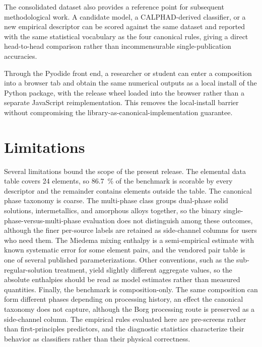 \documentclass[review,times,nonatbib]{elsarticle}
\begin{document}
The consolidated dataset also provides a reference point for
subsequent methodological work. A candidate model, a CALPHAD-derived
classifier, or a new empirical descriptor can be scored against the
same dataset and reported with the same statistical vocabulary as the
four canonical rules, giving a direct head-to-head comparison rather
than incommensurable single-publication accuracies.

Through the Pyodide front end, a researcher or student can enter a
composition into a browser tab and obtain the same numerical outputs
as a local install of the Python package, with the release wheel
loaded into the browser rather than a separate JavaScript
reimplementation. This removes the local-install barrier without
compromising the library-as-canonical-implementation guarantee.

\section{Limitations}

Several limitations bound the scope of the present release. The
elemental data table covers 24 elements, so \SI{86.7}{\percent} of
the benchmark is scorable by every descriptor and the remainder
contains elements outside the table. The canonical phase taxonomy
is coarse. The multi-phase class groups dual-phase solid solutions,
intermetallics, and amorphous alloys together, so the binary
single-phase-versus-multi-phase evaluation does not distinguish
among these outcomes, although the finer per-source labels are
retained as side-channel columns for users who need them. The
Miedema mixing enthalpy is a semi-empirical estimate with known
systematic error for some element pairs, and the vendored pair
table is one of several published parameterizations. Other
conventions, such as the sub-regular-solution treatment, yield
slightly different aggregate values, so the absolute enthalpies
should be read as model estimates rather than measured quantities.
Finally, the benchmark is composition-only. The same composition
can form different phases depending on processing history, an effect
the canonical taxonomy does not capture, although the Borg
processing route is preserved as a side-channel column. The
empirical rules evaluated here are pre-screens rather than
first-principles predictors, and the diagnostic statistics
characterize their behavior as classifiers rather than their
physical correctness.
\end{document}

